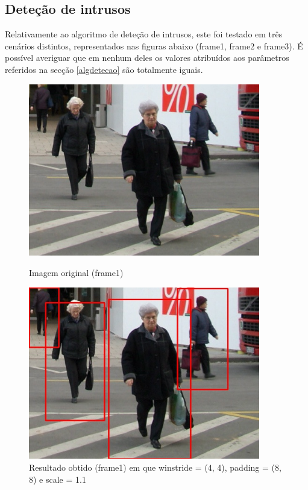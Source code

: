 \subsection{Deteção de intrusos}

Relativamente ao algoritmo de deteção de intrusos, este foi testado em três cenários distintos, representados nas figuras abaixo (frame1, frame2 e frame3). É possível averiguar que em nenhum deles os valores atribuídos aos parâmetros referidos na secção \ref{algdetecao} são totalmente iguais.




\begin{figure}[h]
	\centering
	\begin{minipage}[b]{0.49\textwidth}
		\centering
		\includegraphics[width=0.9\textwidth]{img/vision/exemplos/frame1.jpg}
		\caption[Imagem original (frame1)]{Imagem original (frame1) \newline \newline}
		\label{bluetth05-res}
	\end{minipage}
	\hfill
	\begin{minipage}[b]{0.49\textwidth}
		\centering
		\includegraphics[width=0.9\textwidth]{img/vision/exemplos/result_frame1.jpg}
		\caption[Resultado obtido (frame1)]{Resultado obtido (frame1) em que  winstride = (4, 4), padding = (8, 8) e scale = 1.1}
		\label{comimage1esquema}
	\end{minipage}
\end{figure}



